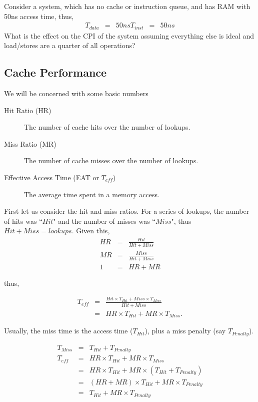 \begin{example}
Consider a system, which has no cache or instruction queue, and has RAM with 50ns access time, thus,
\begin{eqnarray}
T_{data} &=& 50ns
T_{inst} &=& 50ns
\end{eqnarray}
What is the effect on the CPI of the system assuming everything else is ideal and load/stores are a quarter of all operations?


\end{example}

\subsection{Cache Performance}

We will be concerned with some basic numbers
\begin{description}
    \item[Hit Ratio (HR)] The number of cache hits over the number of lookups.
    \item[Miss Ratio (MR)] The number of cache misses over the number of lookups.
    \item[Effective Access Time (EAT or $T_{eff}$)] The average time spent in a memory access.
\end{description}

First let us consider the hit and miss ratios.  For a series of lookups, the number of hits was ``$Hit$" and the number of misses was ``$Miss$", thus $Hit+Miss=lookups$.  Given this,
\begin{eqnarray*}
  HR &=& \frac{Hit}{Hit+Miss} \\
  MR &=& \frac{Miss}{Hit+Miss} \\
  1 &=& HR+MR
\end{eqnarray*}

thus,

\begin{eqnarray*}
  T_{eff} &=& \frac{Hit\times T_{Hit}+Miss\times T_{Miss}}{Hit+Miss} \\
          &=& HR\times T_{Hit}+MR\times T_{Miss}.
\end{eqnarray*}

Usually, the miss time is the access time ($T_{Hit}$), plus a miss penalty (say $T_{Penalty}$).

\begin{eqnarray*}
  T_{Miss}&=& T_{Hit}+T_{Penalty} \\
  T_{eff} &=& HR\times T_{Hit}+MR\times T_{Miss} \\
          &=& HR\times T_{Hit}+MR\times (T_{Hit}+T_{Penalty}) \\
          &=& (HR+MR)\times T_{Hit}+MR\times T_{Penalty} \\
          &=& T_{Hit}+MR\times T_{Penalty}
\end{eqnarray*}





